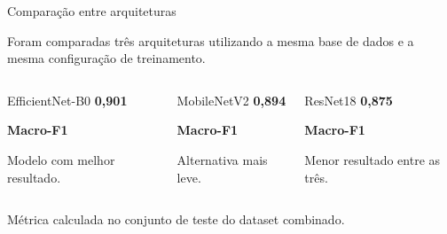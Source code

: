 \begin{frame}{Comparação entre arquiteturas}
	
	\centering
	Foram comparadas três arquiteturas utilizando
	a mesma base de dados e a mesma configuração de treinamento.
	
	\vspace{0.5cm}
	
	\begin{columns}[T,onlytextwidth]
		
		\begin{block}{EfficientNet-B0}
			\centering
			\vspace{0.2cm}
			{\Huge\color{UELGreen}\textbf{0,901}}
			
			\vspace{0.18cm}
			\textbf{Macro-F1}
			
			\vspace{0.2cm}
			\small Modelo com melhor resultado.
		\end{block}
		
		\begin{block}{MobileNetV2}
			\centering
			\vspace{0.2cm}
			{\Huge\color{UELGreen}\textbf{0,894}}
			
			\vspace{0.15cm}
			\textbf{Macro-F1}
			
			\vspace{0.2cm}
			\small Alternativa mais leve.
		\end{block}
		
		\begin{block}{ResNet18}
			\centering
			\vspace{0.2cm}
			{\Huge\color{UELGreen}\textbf{0,875}}
			
			\vspace{0.18cm}
			\textbf{Macro-F1}
			
			\vspace{0.2cm}
			\small Menor resultado entre as três.
		\end{block}
		
	\end{columns}
	
	\vspace{0.4cm}
	
	
	\vspace{0.1cm}
	\centering
	\footnotesize
	Métrica calculada no conjunto de teste do dataset combinado.
	
\end{frame}